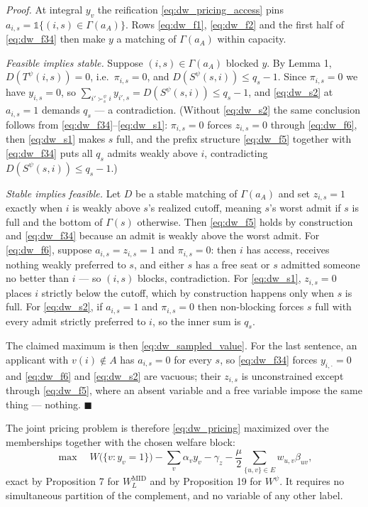 \documentclass{article}
\begin{document}
\textit{Proof.} At integral $y_v$ the reification
\eqref{eq:dw_pricing_access} pins $a_{i,s} = \mathds{1}\{(i,s) \in \Gamma(a_A)\}$.
Rows \eqref{eq:dw_f1}, \eqref{eq:dw_f2} and the first half of
\eqref{eq:dw_f34} then make $y$ a matching of $\Gamma(a_A)$ within capacity.

\emph{Feasible implies stable.} Suppose $(i,s) \in \Gamma(a_A)$ blocked $y$.
By Lemma 1, $D(T^\psi(i,s)) = 0$, i.e.\ $\pi_{i,s} = 0$, and
$D(S^\psi(s,i)) \leq q_s - 1$. Since $\pi_{i,s} = 0$ we have $y_{i,s} = 0$, so
$\sum_{i' \succ_s^\psi i} y_{i',s} = D(S^\psi(s,i)) \leq q_s - 1$, and
\eqref{eq:dw_s2} at $a_{i,s} = 1$ demands $q_s$ --- a contradiction. (Without
\eqref{eq:dw_s2} the same conclusion follows from \eqref{eq:dw_f34}--\eqref{eq:dw_s1}:
$\pi_{i,s} = 0$ forces $z_{i,s} = 0$ through \eqref{eq:dw_f6}, then
\eqref{eq:dw_s1} makes $s$ full, and the prefix structure \eqref{eq:dw_f5}
together with \eqref{eq:dw_f34} puts all $q_s$ admits weakly above $i$,
contradicting $D(S^\psi(s,i)) \leq q_s - 1$.)

\emph{Stable implies feasible.} Let $D$ be a stable matching of $\Gamma(a_A)$
and set $z_{i,s} = 1$ exactly when $i$ is weakly above $s$'s realized cutoff,
meaning $s$'s worst admit if $s$ is full and the bottom of $\Gamma(s)$
otherwise. Then \eqref{eq:dw_f5} holds by construction and \eqref{eq:dw_f34}
because an admit is weakly above the worst admit. For \eqref{eq:dw_f6}, suppose
$a_{i,s} = z_{i,s} = 1$ and $\pi_{i,s} = 0$: then $i$ has access, receives
nothing weakly preferred to $s$, and either $s$ has a free seat or $s$ admitted
someone no better than $i$ --- so $(i,s)$ blocks, contradiction. For
\eqref{eq:dw_s1}, $z_{i,s} = 0$ places $i$ strictly below the cutoff, which by
construction happens only when $s$ is full. For \eqref{eq:dw_s2}, if
$a_{i,s} = 1$ and $\pi_{i,s} = 0$ then non-blocking forces $s$ full with every
admit strictly preferred to $i$, so the inner sum is $q_s$.

The claimed maximum is then \eqref{eq:dw_sampled_value}. For the last sentence,
an applicant with $v(i) \notin A$ has $a_{i,s} = 0$ for every $s$, so
\eqref{eq:dw_f34} forces $y_{i,\cdot} = 0$ and \eqref{eq:dw_f6} and
\eqref{eq:dw_s2} are vacuous; their $z_{i,s}$ is unconstrained except through
\eqref{eq:dw_f5}, where an absent variable and a free variable impose the same
thing --- nothing. $\blacksquare$

The joint pricing problem is therefore \eqref{eq:dw_pricing} maximized over the
memberships together with the chosen welfare block:
\begin{equation}\label{eq:dw_joint_pricing_obj}
\max \quad W\big(\{v : y_v = 1\}\big)
-\sum_v\alpha_v y_v-\gamma_z
-\frac{\mu}{2}\sum_{\{u,v\}\in E}w_{u,v}\beta_{uv} ,
\end{equation}
exact by Proposition 7 for $W^{\mathrm{MID}}_L$ and by Proposition 19 for
$W^{\psi}$. It requires no simultaneous partition of the complement, and no
variable of any other label.
\end{document}
